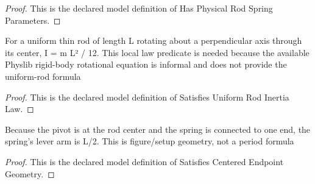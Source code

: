 \begin{proof}
  This is the declared model definition of Has Physical Rod Spring Parameters.
\end{proof}
\begin{definition}
  \label{def:physics:phyx-mini-0268:phyxminiproblems-problemphyxmini0268-satisfiesuniformrodinertialaw}
  For a uniform thin rod of length L rotating about a perpendicular axis through its center, I = m L² / 12. This local law predicate is needed because the available Physlib rigid-body rotational equation is informal and does not provide the uniform-rod formula
\end{definition}
\begin{proof}
  This is the declared model definition of Satisfies Uniform Rod Inertia Law.
\end{proof}
\begin{definition}
  \label{def:physics:phyx-mini-0268:phyxminiproblems-problemphyxmini0268-satisfiescenteredendpointgeometry}
  Because the pivot is at the rod center and the spring is connected to one end, the spring's lever arm is L/2. This is figure/setup geometry, not a period formula
\end{definition}
\begin{proof}
  This is the declared model definition of Satisfies Centered Endpoint Geometry.
\end{proof}
